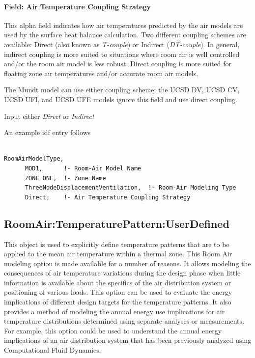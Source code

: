 \paragraph{Field: Air Temperature Coupling Strategy}\label{field-air-temperature-coupling-strategy}

This alpha field indicates how air temperatures predicted by the air models are used by the surface heat balance calculation. Two different coupling schemes are available: Direct (also known as \emph{T-couple}) or Indirect (\emph{DT-couple}). In general, indirect coupling is more suited to situations where room air is well controlled and/or the room air model is less robust. Direct coupling is more suited for floating zone air temperatures and/or accurate room air models.

The Mundt model can use either coupling scheme; the UCSD DV, UCSD CV, UCSD UFI, and UCSD UFE models ignore this field and use direct coupling.

Input either \emph{Direct} or \emph{Indirect}

An example idf entry follows

\begin{lstlisting}

RoomAirModelType,
      MOD1,      !- Room-Air Model Name
      ZONE ONE,  !- Zone Name
      ThreeNodeDisplacementVentilation,  !- Room-Air Modeling Type
      Direct;    !- Air Temperature Coupling Strategy
\end{lstlisting}

\subsection{RoomAir:TemperaturePattern:UserDefined}\label{roomairtemperaturepatternuserdefined}

This object is used to explicitly define temperature patterns that are to be applied to the mean air temperature within a thermal zone. This Room Air modeling option is made available for a number of reasons. It allows modeling the consequences of air temperature variations during the design phase when little information is available about the specifics of the air distribution system or positioning of various loads. This option can be used to evaluate the energy implications of different design targets for the temperature patterns. It also provides a method of modeling the annual energy use implications for air temperature distributions determined using separate analyses or measurements. For example, this option could be used to understand the annual energy implications of an air distribution system that has been previously analyzed using Computational Fluid Dynamics.

